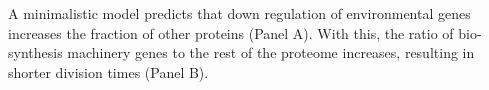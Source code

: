 \label{fig:model}
  A minimalistic model predicts that down regulation of environmental genes increases the fraction of other proteins (Panel A).
With this, the ratio of bio-synthesis machinery genes to the rest of the proteome increases, resulting in shorter division times (Panel B).

